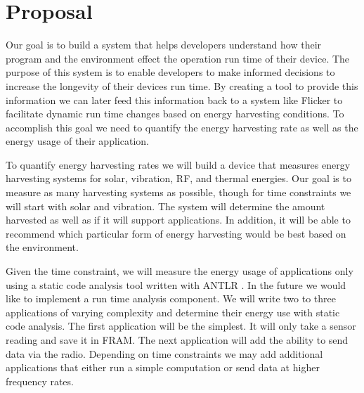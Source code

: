 \section{Proposal} %
\label{sec:proposal}

Our goal is to build a system that helps developers understand how their program and the environment effect the operation run time of their device.
The purpose of this system is to enable developers to make informed decisions to increase the longevity of their devices run time.
By creating a tool to provide this information we can later feed this information back to a system like Flicker \cite{flicker} to facilitate dynamic run time changes based on energy harvesting conditions.
To accomplish this goal we need to quantify the energy harvesting rate as well as the energy usage of their application.

To quantify energy harvesting rates we will build a device that measures energy harvesting systems for solar, vibration, RF, and thermal energies.
Our goal is to measure as many harvesting systems as possible, though for time constraints we will start with solar and vibration.
The system will determine the amount harvested as well as if it will support applications.
In addition, it will be able to recommend which particular form of energy harvesting would be best based on the environment.

Given the time constraint, we will measure the energy usage of applications only using a static code analysis tool written with ANTLR \cite{antlr}.
In the future we would like to implement a run time analysis component.
We will write two to three applications of varying complexity and determine their energy use with static code analysis.
The first application will be the simplest.
It will only take a sensor reading and save it in FRAM.
The next application will add the ability to send data via the radio.
Depending on time constraints we may add additional applications that either run a simple computation or send data at higher frequency rates.
